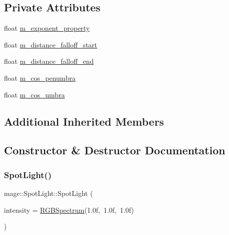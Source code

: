 \subsection*{Private Attributes}
\begin{DoxyCompactItemize}
\item 
float \hyperlink{classmage_1_1_spot_light_ac1ac3c8c25760d8beb7e05c8caeaa6a3}{m\+\_\+exponent\+\_\+property}
\item 
float \hyperlink{classmage_1_1_spot_light_a96c4a4f1b77c9a6aadb82cf48248cc5d}{m\+\_\+distance\+\_\+falloff\+\_\+start}
\item 
float \hyperlink{classmage_1_1_spot_light_a8e0616e3a36d1a05d800cc4a43739178}{m\+\_\+distance\+\_\+falloff\+\_\+end}
\item 
float \hyperlink{classmage_1_1_spot_light_ac5d9f3426397abff72c5098b6e7e8472}{m\+\_\+cos\+\_\+penumbra}
\item 
float \hyperlink{classmage_1_1_spot_light_a9afab31514f93d702f9e516491f262f2}{m\+\_\+cos\+\_\+umbra}
\end{DoxyCompactItemize}
\subsection*{Additional Inherited Members}


\subsection{Constructor \& Destructor Documentation}
\hypertarget{classmage_1_1_spot_light_adc5c7b5fead1b7b0c8728ffd816a9ada}{}\label{classmage_1_1_spot_light_adc5c7b5fead1b7b0c8728ffd816a9ada} 
\subsubsection{\texorpdfstring{Spot\+Light()}{SpotLight()}\hspace{0.1cm}{\footnotesize\ttfamily [1/3]}}
{\footnotesize\ttfamily mage\+::\+Spot\+Light\+::\+Spot\+Light (\begin{DoxyParamCaption}\item[{const \hyperlink{structmage_1_1_r_g_b_spectrum}{R\+G\+B\+Spectrum} \&}]{intensity = {\ttfamily \hyperlink{structmage_1_1_r_g_b_spectrum}{R\+G\+B\+Spectrum}(1.0f,~1.0f,~1.0f)} }\end{DoxyParamCaption})\hspace{0.3cm}{\ttfamily [explicit]}}

